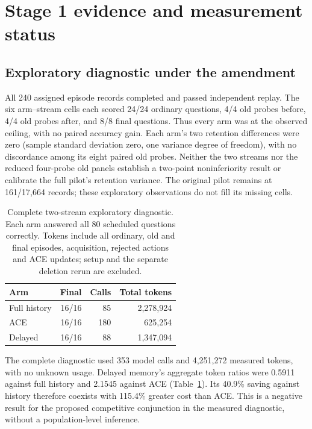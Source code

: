 \documentclass[10pt,twocolumn]{article}
\begin{document}
\section{Stage 1 evidence and measurement status}


\subsection{Exploratory diagnostic under the amendment}
All 240 assigned episode records completed and passed independent replay. The
six arm--stream cells each scored 24/24 ordinary questions, 4/4 old probes before,
4/4 old probes after, and 8/8 final questions. Thus every arm was at the observed
ceiling, with no paired accuracy gain. Each arm's two retention differences were
zero (sample standard deviation zero, one variance degree of freedom), with no
discordance among its eight paired old probes. Neither the two streams nor the reduced
four-probe old panels establish a two-point noninferiority result or calibrate
the full pilot's retention variance. The original pilot remains at 161/17,664
records; these exploratory observations do not fill its missing cells.

\begin{table}[t]\centering\small
\begin{tabular}{lrrr}
\toprule Arm & Final & Calls & Total tokens\\\midrule
Full history & 16/16 & 85 & 2,278,924\\
ACE & 16/16 & 180 & 625,254\\
Delayed & 16/16 & 88 & 1,347,094\\
\bottomrule\end{tabular}
\caption{Complete two-stream exploratory diagnostic. Each arm answered all
80 scheduled questions correctly. Tokens include all ordinary, old and final
episodes, acquisition, rejected actions and ACE updates; setup and the separate
deletion rerun are excluded.}\label{tab:exploratory}
\end{table}

The complete diagnostic used 353 model calls and 4,251,272 measured tokens,
with no unknown usage. Delayed memory's aggregate token ratios were 0.5911
against full history and 2.1545 against ACE (Table~\ref{tab:exploratory}). Its
40.9\% saving against history therefore coexists with 115.4\% greater cost than
ACE. This is a negative result for the proposed competitive conjunction in
the measured diagnostic, without a population-level inference.
\end{document}
